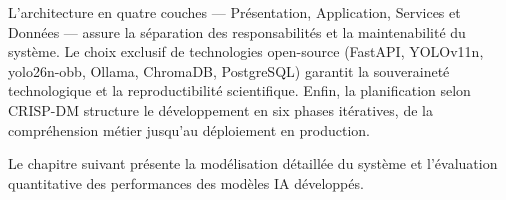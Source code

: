 L'architecture en quatre couches --- Présentation, Application, Services et Données ---
assure la séparation des responsabilités et la maintenabilité du système.
Le choix exclusif de technologies open-source (FastAPI, YOLOv11n, yolo26n-obb,
Ollama, ChromaDB, PostgreSQL) garantit la souveraineté technologique et la
reproductibilité scientifique. Enfin, la planification selon CRISP-DM structure
le développement en six phases itératives, de la compréhension métier jusqu'au
déploiement en production.

Le chapitre suivant présente la modélisation détaillée du système et l'évaluation
quantitative des performances des modèles IA développés.
